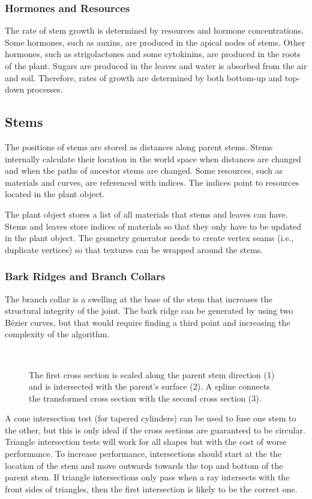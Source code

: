 \documentclass[10pt]{article}
\begin{document}
\subsubsection{Hormones and Resources}
The rate of stem growth is determined by resources and hormone concentrations. Some hormones, such as auxins, are produced in the apical nodes of stems. Other hormones, such as strigolactones and some cytokinins, are produced in the roots of the plant. Sugars are produced in the leaves and water is absorbed from the air and soil. Therefore, rates of growth are determined by both bottom-up and top-down processes.

\subsection{Stems}
The positions of stems are stored as distances along parent stems. Stems internally calculate their location in the world space when distances are changed and when the paths of ancestor stems are changed. Some resources, such as materials and curves, are referenced with indices. The indices point to resources located in the plant object.

The plant object stores a list of all materials that stems and leaves can have. Stems and leaves store indices of materials so that they only have to be updated in the plant object. The geometry generator needs to create vertex seams (i.e., duplicate vertices) so that textures can be wrapped around the stems.

\subsubsection{Bark Ridges and Branch Collars}
The branch collar is a swelling at the base of the stem that increases the structural integrity of the joint. The bark ridge can be generated by using two B\'{e}zier curves, but that would require finding a third point and increasing the complexity of the algorithm.

\begin{figure}[H]
  \centering
   \\
  \caption{The first cross section is scaled along the parent stem direction (1) and is intersected with the parent's surface (2). A spline connects the transformed cross section with the second cross section (3).}
\end{figure}

A cone intersection test (for tapered cylinders) can be used to fuse one stem to the other, but this is only ideal if the cross sections are guaranteed to be circular. Triangle intersection tests will work for all shapes but with the cost of worse performance. To increase performance, intersections should start at the the location of the stem and move outwards towards the top and bottom of the parent stem. If triangle intersections only pass when a ray intersects with the front sides of triangles, then the first intersection is likely to be the correct one.
\end{document}
